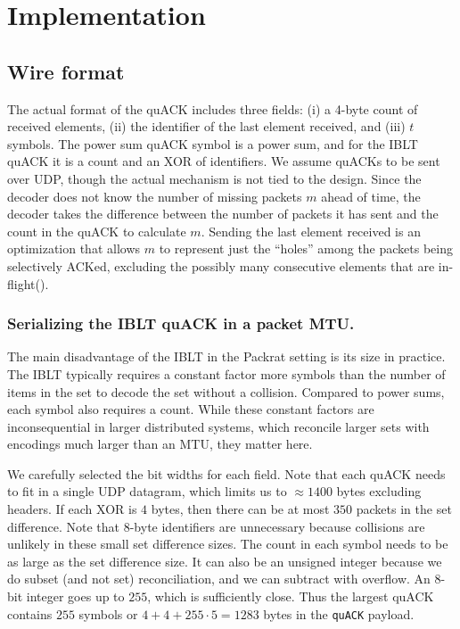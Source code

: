 \section{Implementation}
\label{sec:quack:implementation}

\subsection{Wire format}

The actual format of the quACK includes three fields: (i) a 4-byte count of
received elements, (ii) the identifier of the last element received, and
(iii) $t$ symbols. The power sum quACK symbol is a power sum, and for the IBLT
quACK it is a count and an XOR of identifiers. We assume quACKs to be sent over
UDP, though the actual mechanism is not tied to the design. Since the decoder
does not know the number of missing packets $m$ ahead of time, the decoder
takes the difference between the number of packets it has sent and the count in
the quACK to calculate $m$. Sending the last element received is an
optimization that allows $m$ to represent just the ``holes'' among the packets
being selectively ACKed, excluding the possibly many consecutive elements that
are in-flight().

\subsubsection{Serializing the IBLT quACK in a packet MTU.}

The main disadvantage of the IBLT in
the Packrat setting is its size in practice. The IBLT typically requires a constant factor
more symbols than the number of items in the set to decode the set without a
collision. Compared to power sums, each symbol also requires a count. While
these constant factors are inconsequential in larger distributed systems,
which reconcile larger sets with encodings much larger than an MTU, they
matter here.

We carefully selected the bit widths for each field. Note that each quACK needs
to fit in a single UDP datagram, which limits us to $\approx\!1400$ bytes
excluding headers. If each XOR is $4$ bytes, then there can be at most $350$
packets in the set difference. Note that $8$-byte identifiers are unnecessary
because collisions are unlikely in these small set difference sizes. The count
in each symbol needs to be as large as the set difference size. It can also be
an unsigned integer because we do subset (and not set) reconciliation, and we
can subtract with overflow. An 8-bit integer goes up to $255$, which is
sufficiently close. Thus the largest quACK contains $255$ symbols or $4 +
4 + 255 \cdot 5 = 1283$ bytes in the \texttt{quACK} payload.

